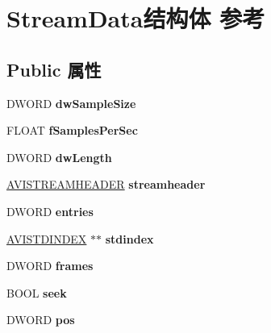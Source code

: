 \hypertarget{struct_stream_data}{}\section{Stream\+Data结构体 参考}
\label{struct_stream_data}
\subsection*{Public 属性}
\begin{DoxyCompactItemize}
\item 
\mbox{\label{struct_stream_data_a8c49c030a201c7aadccc0afe1efad880}} 
D\+W\+O\+RD {\bfseries dw\+Sample\+Size}
\item 
\mbox{\label{struct_stream_data_a7061f288358f5fa9e2217d0ce766b4af}} 
F\+L\+O\+AT {\bfseries f\+Samples\+Per\+Sec}
\item 
\mbox{\label{struct_stream_data_a4922d45ab77acbfd17efbaedb8533ed8}} 
D\+W\+O\+RD {\bfseries dw\+Length}
\item 
\mbox{\label{struct_stream_data_acce3d8e86e6438bf619c71e4047e3893}} 
\hyperlink{struct__avistreamheader}{A\+V\+I\+S\+T\+R\+E\+A\+M\+H\+E\+A\+D\+ER} {\bfseries streamheader}
\item 
\mbox{\label{struct_stream_data_a3528718f61058a5ce0b92a0505ba9712}} 
D\+W\+O\+RD {\bfseries entries}
\item 
\mbox{\label{struct_stream_data_ac6aee902592ae4d16b188ccf86754b20}} 
\hyperlink{struct__avistdindex}{A\+V\+I\+S\+T\+D\+I\+N\+D\+EX} $\ast$$\ast$ {\bfseries stdindex}
\item 
\mbox{\label{struct_stream_data_ac419803cda63a04f92e6e4dd2b333f2f}} 
D\+W\+O\+RD {\bfseries frames}
\item 
\mbox{\label{struct_stream_data_a94136f55556f2ce7faa8359b46275f19}} 
B\+O\+OL {\bfseries seek}
\item 
\mbox{\label{struct_stream_data_a270fdad5ad2eb958fd6017b75fe45261}} 
D\+W\+O\+RD {\bfseries pos}
$$
\end{DoxyCompactItemize}
